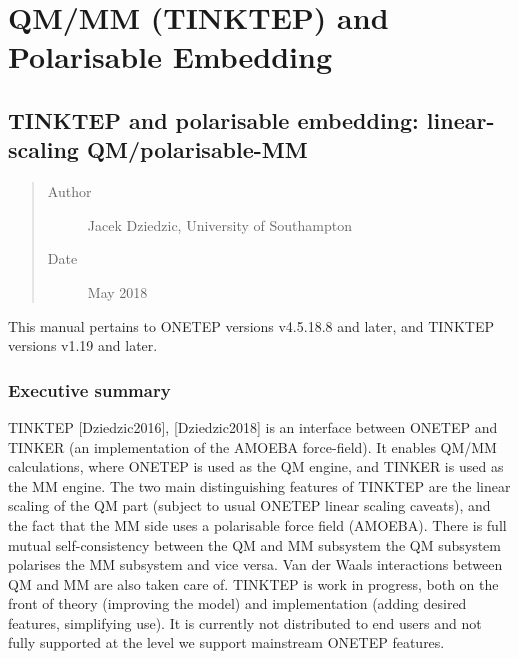 \documentclass[letterpaper,10pt,english]{sphinxmanual}
\begin{document}
\chapter{QM/MM (TINKTEP) and Polarisable Embedding}
\label{\detokenize{index_qmmm::doc}}\label{\detokenize{index_qmmm:qm-mm-tinktep-and-polarisable-embedding}}

\section{TINKTEP and polarisable embedding: linear-scaling QM/polarisable-MM}
\label{\detokenize{tinktep::doc}}\label{\detokenize{tinktep:tinktep-and-polarisable-embedding-linear-scaling-qm-polarisable-mm}}\begin{quote}\begin{description}
\item[{Author}] \leavevmode
Jacek Dziedzic, University of Southampton

\item[{Date}] \leavevmode
May 2018

\end{description}\end{quote}

This manual pertains to ONETEP versions v4.5.18.8 and later, and TINKTEP
versions v1.19 and later.


\subsection{Executive summary}
\label{\detokenize{tinktep:executive-summary}}
TINKTEP {[}Dziedzic2016{]}, {[}Dziedzic2018{]} is an interface between
ONETEP and TINKER (an implementation of the AMOEBA force-field). It
enables QM/MM calculations, where ONETEP is used as the QM engine, and
TINKER is used as the MM engine. The two main distinguishing features of
TINKTEP are the linear scaling of the QM part (subject to usual ONETEP
linear scaling caveats), and the fact that the MM side uses a
polarisable force field (AMOEBA). There is full mutual self-consistency
between the QM and MM subsystem \textendash{} the QM subsystem polarises the MM
subsystem and vice versa. Van der Waals interactions between QM and MM
are also taken care of. TINKTEP is work in progress, both on the front
of theory (improving the model) and implementation (adding desired
features, simplifying use). It is currently not distributed to end users
and not fully supported at the level we support mainstream ONETEP
features.
\end{document}
